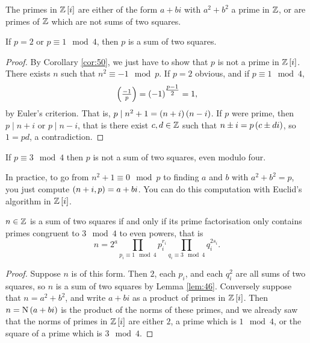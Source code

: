 \pagebreak

\begin{corollary}
\label{cor:50}
The primes in $ \ZZ\sbr{i} $ are either of the form $ a + bi $ with $ a^2 + b^2 $ a prime in $ \mathbb{Z} $, or are primes of $ \mathbb{Z} $ which are not sums of two squares.
\end{corollary}

\begin{theorem}
If $ p = 2 $ or $ p \equiv 1 \mod 4 $, then $ p $ is a sum of two squares.
\end{theorem}

\begin{proof}
By Corollary \ref{cor:50}, we just have to show that $ p $ is not a prime in $ \ZZ\sbr{i} $. There exists $ n $ such that $ n^2 \equiv -1 \mod p $. If $ p = 2 $ obvious, and if $ p \equiv 1 \mod 4 $,
$$ \symbol{-1}{p} = \br{-1}^{\tfrac{p - 1}{2}} = 1, $$
by Euler's criterion. That is, $ p \mid n^2 + 1 = \br{n + i}\br{n - i} $. If $ p $ were prime, then $ p \mid n + i $ or $ p \mid n - i $, that is there exist $ c, d \in \mathbb{Z} $ such that $ n \pm i = p\br{c \pm di} $, so $ 1 = pd $, a contradiction.
\end{proof}

\begin{remark*}
If $ p \equiv 3 \mod 4 $ then $ p $ is not a sum of two squares, even modulo four.
\end{remark*}

\begin{remark*}
In practice, to go from $ n^2 + 1 \equiv 0 \mod p $ to finding $ a $ and $ b $ with $ a^2 + b^2 = p $, you just compute $ \br{n + i, p} = a + bi $. You can do this computation with Euclid's algorithm in $ \ZZ\sbr{i} $.
\end{remark*}

\begin{theorem}
$ n \in \mathbb{Z} $ is a sum of two squares if and only if its prime factorisation only contains primes congruent to $ 3 \mod 4 $ to even powers, that is
$$ n = 2^a\prod_{p_i \equiv 1 \mod 4} p_i^{r_i}\prod_{q_i \equiv 3 \mod 4} q_i^{2s_i}. $$
\end{theorem}

\begin{proof}
Suppose $ n $ is of this form. Then $ 2 $, each $ p_i $, and each $ q_i^2 $ are all sums of two squares, so $ n $ is a sum of two squares by Lemma \ref{lem:46}. Conversely suppose that $ n = a^2 + b^2 $, and write $ a + bi $ as a product of primes in $ \ZZ\sbr{i} $. Then $ n = \N\br{a + bi} $ is the product of the norms of these primes, and we already saw that the norms of primes in $ \ZZ\sbr{i} $ are either $ 2 $, a prime which is $ 1 \mod 4 $, or the square of a prime which is $ 3 \mod 4 $.
\end{proof}

